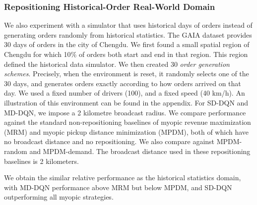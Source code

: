 \subsubsection{Repositioning Historical-Order Real-World Domain}
We also experiment with a simulator that uses historical days of orders instead of generating orders randomly from historical statistics. The GAIA dataset provides 30 days of orders in the city of Chengdu. We first found a small spatial region of Chengdu for which 10$\%$ of orders both start and end in that region. This region defined the historical data simulator. We then created 30 {\em order generation schemes}. Precisely, when the environment is reset, it randomly selects one of the 30 days, and generates orders exactly according to how orders arrived on that day. We used a fixed number of drivers (100), and a fixed speed (40 km/h). An illustration of this environment can be found in the appendix. For SD-DQN and MD-DQN, we impose a 2 kilometre broadcast radius. We compare performance against the standard non-repositioning baselines of myopic revenue maximization (MRM) and myopic pickup distance minimization (MPDM), both of which have no broadcast distance and no repositioning. We also compare against MPDM-random and MPDM-demand. The broadcast distance used in these repositioning baselines is 2 kilometers.

We obtain the similar relative performance as the historical statistics domain, with MD-DQN performance above MRM but below MPDM, and SD-DQN outperforming all myopic strategies.  


\begin{center}
\begin{table}
\caption{10\% region real data}
\end{table}
\end{center}



